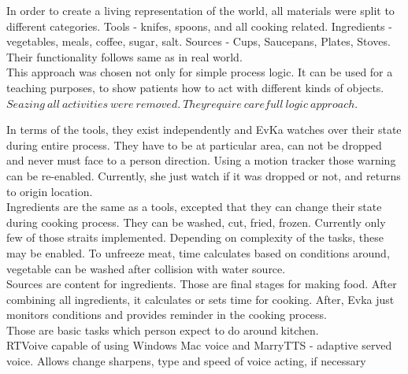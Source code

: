 \documentclass[18pt]{article}
\numberwithin{equation}{section} %
\numberwithin{figure}{section} %
\numberwithin{table}{section} %
\begin{document}
	In order to create a living representation of the world, all materials were split to different categories. Tools - knifes, spoons, and all cooking related. Ingredients - vegetables, meals, coffee, sugar, salt. Sources - Cups, Saucepans, Plates, Stoves. Their functionality follows same as in real world. \\
	This approach was chosen not only for simple process logic. It can be used for a teaching purposes, to show patients how to act with different kinds of objects. \\
	
	$ Seazing\ all\ activities\ were\ removed.\ They require\ carefull\ logic\ approach. $
	
	In terms of the tools, they exist independently and EvKa watches over their state during entire process. They have to be at particular area, can not be dropped and never must face to a person direction. Using a motion tracker those warning can be re-enabled. Currently, she just watch if it was dropped or not, and returns to origin location. \\
	
	Ingredients are the same as a tools, excepted that they can change their state during cooking process. They can be washed, cut, fried, frozen. Currently only few of those straits implemented. Depending on complexity of the tasks, these may be enabled. To unfreeze meat, time calculates based on conditions around, vegetable can be washed after collision with water source. \\
	
	Sources are content for ingredients. Those are final stages for making food. After combining all ingredients, it calculates or sets time for cooking. After, Evka just monitors conditions and provides reminder in the cooking process. \\
	
	Those are basic tasks which person expect to do around kitchen. \\
	

	
	RTVoive capable of using Windows Mac voice and MarryTTS - adaptive served voice. Allows change sharpens, type and speed of voice acting, if necessary
	
\end{document}
